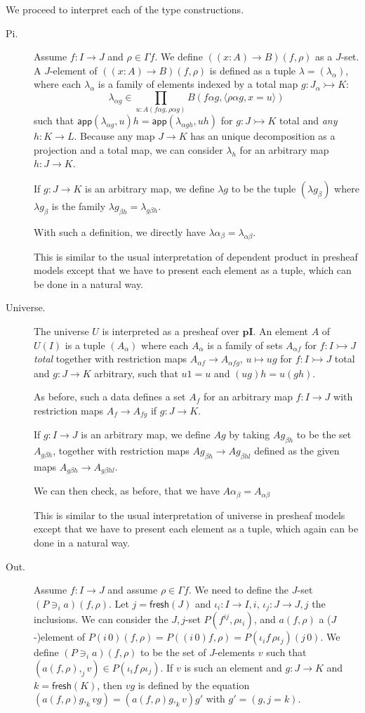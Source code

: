 \documentclass[english]{PaperTools/latex/lipics}
\newcommand\op[1]{∋_{#1}}
\def\pI{\ensuremath{\mathbf{pI}}}
\def\fresh#1{\mathsf{fresh}(#1)}
\def\app#1#2{\mathsf{app}(#1,#2)}
\begin{document}
\bigskip
We proceed to interpret each of the type constructions.
\begin{description}
  \item[\sc Pi.]
    Assume $f : I → J$ and $ρ ∈ Γf$. We define $((x:A) → B)(f,ρ)$ as a $J$-set.
    A $J$-element of $((x:A) → B)(f,ρ)$ is defined as a tuple $λ = (λ_α)$,
    where each $λ_α$ is a family of elements indexed by a total map $g : J_α ↣ K$:
    $$λ_{α g} ∈ \prod_{u : A(fα g,ραg)} B(fαg,⟨ραg,x=u⟩)$$
    such that
    $\app{λ_{αg}}{u} h = \app{λ_{α gh}}{uh}$ for $g : J ↣ K$ total and \emph{any} $h : K → L$.
    Because any map $J → K$ has an unique decomposition as a projection and a total
    map, we can consider $λ_h$ for an arbitrary map $h : J → K$.

    If $g : J → K$ is an arbitrary map, we define $λ g$ to be the tuple
    $(λ g_β)$ where $λ g_β$ is the family $λ g_{βh} = λ_{gβh}$.

    With such a definition, we directly have $λα_{β} = λ_{αβ}$.

    This is similar to the usual interpretation of dependent product in
    presheaf models \citep{Hofmann97syntaxand,bezem2014model} except that we
    have to present each element as a tuple, which can be done in a natural way.


  \item[\sc Universe.]
    The universe $U$ is interpreted as a presheaf over \pI. An element $A$ of
    $U(I)$ is a tuple $(A_α)$ where each $A_α$ is a family of sets
    $A_{α f}$ for $f : I ↣ J$ \emph{total} together with restriction
    maps $A_{α f} → A_{α fg}$, $u ↦ ug$ for $f : I ↣ J$ total
    and $g : J → K$ arbitrary, such that $u1 = u$ and $(ug)h = u(gh)$.

    As before, such a data defines a set $A_f$ for an arbitrary map $f : I → J$
    with restriction maps $A_f → A_{fg}$ if $g : J → K$.

    If $g : I → J$ is an arbitrary map, we define $Ag$ by taking $Ag_{βh}$
    to be the set $A_{gβh}$, together with restriction maps $Ag_{βh} → Ag_{βhl}$
    defined as the given maps $A_{gβh} → A_{gβhl}$.

    We can then check, as before, that we have $Aα_{β} = A_{αβ}$

    This is similar to the usual interpretation of universe in
    presheaf models \citep{Hofmann97syntaxand,bezem2014model} except that we
    have to present each element as a tuple, which again can be done in a natural way.


  \item[\sc Out.]
    Assume $f : I → J$ and assume $ρ ∈ Γf$.  We need to define the $J$-set $(P \op {i} a)(f,ρ)$.
    Let $j = \fresh J$ and $ι_i : I → I,i$, $ι_j : J → J,j$ the inclusions.
    We can consider the $J,j$-set $P(f^{ij},ρι_i)$, and $a(f,ρ)$ a ($J$-)element of
    $P(i\,0)(f,ρ) = P((i\,0)f,ρ) = P(ι_i f\,ρι_j)(j\,0)$.
    We define $(P \op {i} a)(f,ρ)$ to be the set of $J$-elements $v$ such that
    $(a(f,ρ),_j v) ∈ P(ι_i f\,ρι_j)$. If $v$ is such an element and $g : J → K$
    and $k=\fresh K$, then $vg$ is defined by the equation
    $(a(f,ρ)g,_k vg) = (a(f,ρ)g,_k v) g'$ with $g' = (g,j=k)$.



\end{description}
\end{document}
